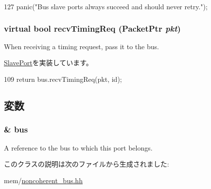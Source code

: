 \begin{DoxyCode}
127         { panic("Bus slave ports always succeed and should never retry.\n"); }
\end{DoxyCode}
\hypertarget{classNoncoherentBus_1_1NoncoherentBusSlavePort_ad3786e65574e70ec0a5bd2b0ce311d20}{
\subsubsection[{recvTimingReq}]{\setlength{\rightskip}{0pt plus 5cm}virtual bool recvTimingReq ({\bf PacketPtr} {\em pkt})}}
\label{classNoncoherentBus_1_1NoncoherentBusSlavePort_ad3786e65574e70ec0a5bd2b0ce311d20}
When receiving a timing request, pass it to the bus. 

\hyperlink{classSlavePort_abcece77e42f88ee41af8d3d01bb48253}{SlavePort}を実装しています。


\begin{DoxyCode}
109         { return bus.recvTimingReq(pkt, id); }
\end{DoxyCode}


\subsection{変数}
\hypertarget{classNoncoherentBus_1_1NoncoherentBusSlavePort_aea8faab4afa44810e2dfac0ab026fb82}{
\subsubsection[{bus}]{\& {\bf bus}}}
\label{classNoncoherentBus_1_1NoncoherentBusSlavePort_aea8faab4afa44810e2dfac0ab026fb82}
A reference to the bus to which this port belongs. 

このクラスの説明は次のファイルから生成されました:\begin{DoxyCompactItemize}
\item 
mem/\hyperlink{noncoherent__bus_8hh}{noncoherent\_\-bus.hh}\end{DoxyCompactItemize}

